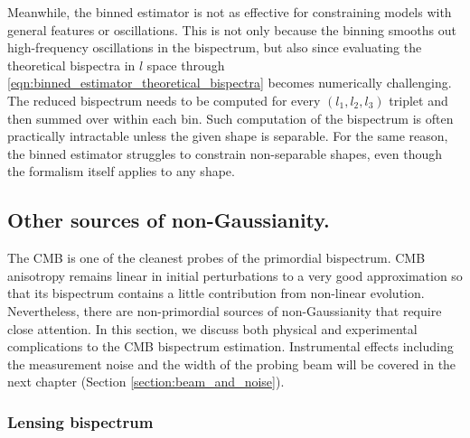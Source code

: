 Meanwhile, the binned estimator is not as effective for constraining models with general features or oscillations. This is not only because the binning smooths out high-frequency oscillations in the bispectrum, but also since evaluating the theoretical bispectra in $l$ space through \eqref{eqn:binned_estimator_theoretical_bispectra} becomes numerically challenging. The reduced bispectrum needs to be computed for every $(l_1,l_2,l_3)$ triplet and then summed over within each bin. Such computation of the bispectrum is often practically intractable unless the given shape is separable. For the same reason, the binned estimator struggles to constrain non-separable shapes, even though the formalism itself applies to any shape.


\subsection{Other sources of non-Gaussianity.} \label{section:other_sources_of_non_gaussianity}

The CMB is one of the cleanest probes of the primordial bispectrum. CMB anisotropy remains linear in initial perturbations to a very good approximation so that its bispectrum contains a little contribution from non-linear evolution. Nevertheless, there are non-primordial sources of non-Gaussianity that require close attention. In this section, we discuss both physical and experimental complications to the CMB bispectrum estimation. Instrumental effects including the measurement noise and the width of the probing beam will be covered in the next chapter (Section \ref{section:beam_and_noise}).


\subsubsection*{Lensing bispectrum}

